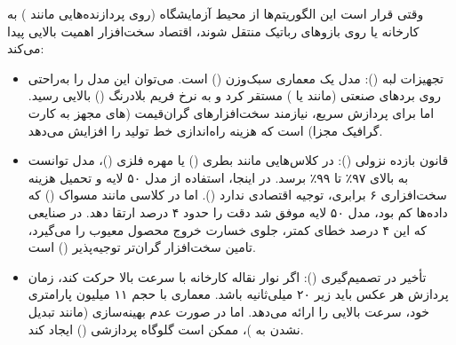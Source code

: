 \documentclass{article}
\begin{document}
\begin{table}[htbp]
	\caption{مقایسه شاخص‌های فنی و سخت‌افزاری مدل  و }
	\label{tab:hardware_comparison}
	\centering
	\vspace{2mm}
\end{table}


وقتی قرار است این الگوریتم‌ها از محیط آزمایشگاه (روی پردازنده‌هایی مانند ) به کارخانه یا روی بازوهای رباتیک منتقل شوند، اقتصاد سخت‌افزار اهمیت بالایی پیدا می‌کند:

\begin{itemize}
	\item تجهیزات لبه ():
	مدل  یک معماری سبک‌وزن () است. می‌توان این مدل را به‌راحتی روی بردهای صنعتی (مانند  یا ) مستقر کرد و به نرخ فریم بلادرنگ () بالایی رسید. اما  برای پردازش سریع، نیازمند سخت‌افزارهای گران‌قیمت (های مجهز به کارت گرافیک مجزا) است که هزینه راه‌اندازی خط تولید را افزایش می‌دهد.
	
	\item قانون بازده نزولی ():
	در کلاس‌هایی مانند بطری () یا مهره فلزی ()، مدل  توانست به  بالای ۹۷٪ تا ۹۹٪ برسد. در اینجا، استفاده از مدل ۵۰ لایه و تحمیل هزینه سخت‌افزاری ۶ برابری، توجیه اقتصادی ندارد (). اما در کلاسی مانند مسواک () که داده‌ها کم بود، مدل ۵۰ لایه موفق شد دقت را حدود ۴ درصد ارتقا دهد. در صنایعی که این ۴ درصد خطای کمتر، جلوی خسارت خروج محصول معیوب را می‌گیرد، تامین سخت‌افزار گران‌تر توجیه‌پذیر () است.
	
	\item تأخیر در تصمیم‌گیری ():
	اگر نوار نقاله کارخانه با سرعت بالا حرکت کند، زمان پردازش هر عکس باید زیر ۲۰ میلی‌ثانیه باشد. معماری  با حجم ۱۱ میلیون پارامتری خود، سرعت بالایی را ارائه می‌دهد. اما  در صورت عدم بهینه‌سازی (مانند تبدیل نشدن به )، ممکن است گلوگاه پردازشی () ایجاد کند.
\end{itemize}
\end{document}
